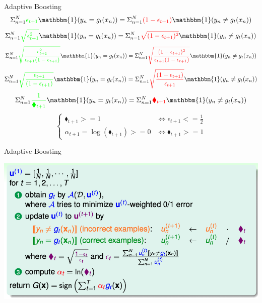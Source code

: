 \documentclass[
  ignorenonframetext,
]{beamer}
\begin{document}
\begin{frame}{Adaptive Boosting}
$$
  \Sigma_{n=1}^N \textcolor{green}{\epsilon_{t+1}} \mathbbm{1}(y_n = g_t(x_n)) =
  \Sigma_{n=1}^N \textcolor{red}{(1-\epsilon_{t+1})} \mathbbm{1}(y_n \neq g_t(x_n))
$$
$$
  \Sigma_{n=1}^N \textcolor{green}{\sqrt{\epsilon_{t+1}^2}} \mathbbm{1}(y_n = g_t(x_n)) =
  \Sigma_{n=1}^N \textcolor{red}{\sqrt{(1-\epsilon_{t+1})^2}} \mathbbm{1}(y_n \neq g_t(x_n))
$$
$$
  \Sigma_{n=1}^N \textcolor{green}{\sqrt{\frac{\epsilon_{t+1}^2}{\epsilon_{t+1}(1-\epsilon_{t+1})}}} \mathbbm{1}(y_n = g_t(x_n)) =
 \Sigma_{n=1}^N  \textcolor{red}{\sqrt{\frac{(1-\epsilon_{t+1})^2}{\epsilon_{t+1}(1-\epsilon_{t+1})}}} \mathbbm{1}(y_n \neq g_t(x_n))
$$
$$
  \Sigma_{n=1}^N \textcolor{green}{\sqrt{\frac{\epsilon_{t+1}}{(1-\epsilon_{t+1})}}} \mathbbm{1}(y_n = g_t(x_n)) =
  \Sigma_{n=1}^N \textcolor{red}{\sqrt{\frac{(1-\epsilon_{t+1})}{\epsilon_{t+1}}}} \mathbbm{1}(y_n \neq g_t(x_n))
$$
$$
\Sigma_{n=1}^N \textcolor{green}{\frac{1}{\blacklozenge_{t+1}}}  \mathbbm{1}(y_n = g_t(x_n))  =
\Sigma_{n=1}^N \textcolor{red}{\blacklozenge_{t+1}}  \mathbbm{1}(y_n \neq g_t(x_n)) 
$$
$$
\begin{cases}
  \blacklozenge_{t+1} >= 1 & \iff \epsilon_{t+1} <= \frac{1}{2} \\
  \alpha_{t+1} = \log(\blacklozenge_{t+1}) >= 0 & \iff \blacklozenge_{t+1} >= 1
\end{cases}
$$
\end{frame}


\begin{frame}{Adaptive Boosting}
\begin{center}
  \includegraphics{figure/pdf/boost3.png}
\end{center}
\end{frame}
\end{document}
